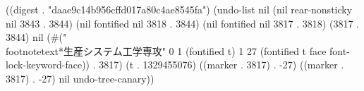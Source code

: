 
((digest . "daae9c14b956cffd017a80c4ae8545fa") (undo-list nil (nil rear-nonsticky nil 3843 . 3844) (nil fontified nil 3818 . 3844) (nil fontified nil 3817 . 3818) (3817 . 3844) nil (#(" \\footnotetext{*生産システム工学専攻}" 0 1 (fontified t) 1 27 (fontified t face font-lock-keyword-face)) . 3817) (t . 1329455076) ((marker . 3817) . -27) ((marker . 3817) . -27) nil undo-tree-canary))
